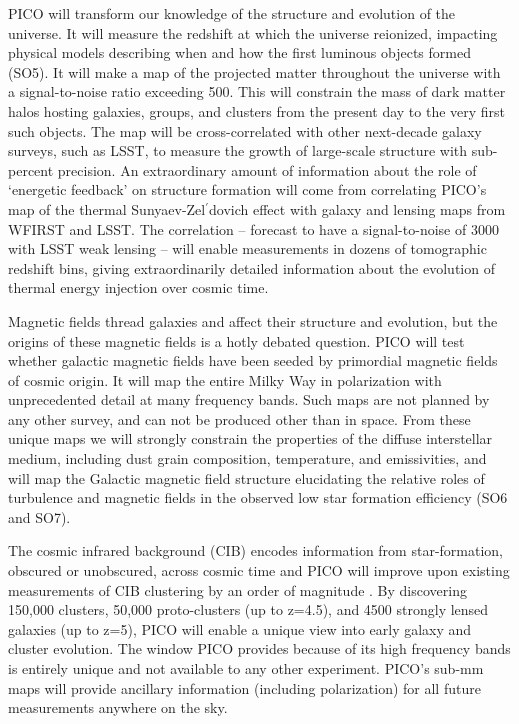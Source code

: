 \documentclass[PICOReport.tex]{subfiles}
\begin{document}
PICO will transform our knowledge of the structure and evolution of the universe. It will measure the redshift at which the universe reionized, impacting physical models describing when and how the first luminous objects formed (SO5).  It will make a map of the projected matter throughout the universe with a signal-to-noise ratio exceeding 500. This will constrain the mass of dark matter halos hosting galaxies, groups, and clusters from the present day to the very first such objects.  The map will be cross-correlated with other next-decade galaxy surveys, such as LSST, to measure the growth of large-scale structure with sub-percent precision.  An extraordinary amount of information about the role of `energetic feedback' on structure formation will come from correlating PICO's map of the thermal Sunyaev-Zel$^{\prime}$dovich effect with galaxy and lensing maps from WFIRST and LSST. The correlation -- forecast to have a signal-to-noise of 3000 with LSST weak lensing -- will enable measurements in dozens of tomographic redshift bins, giving extraordinarily detailed information about the evolution of thermal energy injection over cosmic time.

Magnetic fields thread galaxies and affect their structure and evolution, but the origins of these magnetic fields is a hotly debated question. PICO will test whether galactic magnetic fields have been seeded by primordial magnetic fields of cosmic origin. It will map the entire Milky Way in polarization with unprecedented detail at many frequency bands. Such maps are not planned by any other survey, and can not be produced other than in space.  From these unique maps we will strongly constrain the properties of the diffuse interstellar medium, including dust grain composition, temperature, and emissivities, and will map the Galactic magnetic field structure elucidating the relative roles of turbulence and magnetic fields in the observed low star formation efficiency (SO6 and SO7).

The cosmic infrared background (CIB) encodes information from star-formation, obscured or unobscured, across cosmic time and PICO will improve upon existing measurements of CIB clustering by an order of magnitude .  By discovering 150,000 clusters, 50,000 proto-clusters (up to z=4.5), and 4500 strongly lensed galaxies (up to z=5), PICO will enable a unique view into early galaxy and cluster evolution. The window PICO provides because of its high frequency bands is entirely unique and not available to any other experiment.  PICO's sub-mm maps will provide ancillary information (including polarization) for all future measurements anywhere on the sky.  
\end{document}
